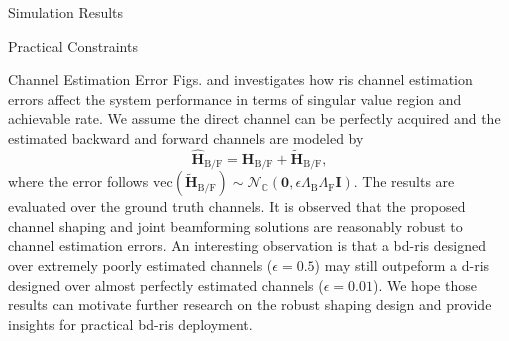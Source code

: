 \documentclass[journal]{IEEEtran}
\begin{document}
\begin{section}{Simulation Results}
\begin{subsection}{Practical Constraints}
\begin{subsubsection}{Channel Estimation Error}
			Figs.  and  investigates how \gls{ris} channel estimation errors affect the system performance in terms of singular value region and achievable rate.
			We assume the direct channel can be perfectly acquired and the estimated backward and forward channels are modeled by
			\begin{equation*}
				\hat{\mathbf{H}}_{\mathrm{B/F}} = \mathbf{H}_{\mathrm{B/F}} + \tilde{\mathbf{H}}_{\mathrm{B/F}},
			\end{equation*}
			where the error follows $\mathrm{vec}(\tilde{\mathbf{H}}_{\mathrm{B/F}}) \sim \mathcal{N}_\mathbb{C}(\mathbf{0}, \epsilon \Lambda_\mathrm{B} \Lambda_\mathrm{F}\mathbf{I})$.
			The results are evaluated over the ground truth channels.
			It is observed that the proposed channel shaping and joint beamforming solutions are reasonably robust to channel estimation errors.
			An interesting observation is that a \gls{bd}-\gls{ris} designed over extremely poorly estimated channels ($\epsilon = 0.5$) may still outpeform a \gls{d}-\gls{ris} designed over almost perfectly estimated channels ($\epsilon = 0.01$).
			We hope those results can motivate further research on the robust shaping design and provide insights for practical \gls{bd}-\gls{ris} deployment.



\end{subsubsection}
\end{subsection}
\end{section}
\end{document}
